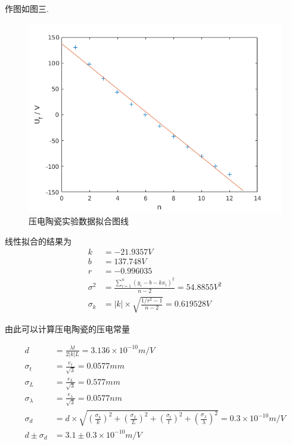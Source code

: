 \documentclass[a4paper,10pt,notitlepage]{article}
\begin{document}
	作图如图三. \\
	
\begin{figure}
\centering
	\includegraphics[scale=0.7]{f3.png}
	\caption{压电陶瓷实验数据拟合图线}
\end{figure}

	线性拟合的结果为 \\
	
\begin{align*}
	k &= -21.9357 V \\
	b &= 137.748 V \\
	r &= -0.996035 \\
	\sigma^2 &= \frac{\sum_{i = 1}^{n}(y_i - b - kx_i)^2}{n - 2} = 54.8855 V^2 \\
	\sigma_k &= |k| \times \sqrt{\frac{1/r^2 - 1}{n - 2}} = 0.619528V 
\end{align*}

	由此可以计算压电陶瓷的压电常量
	
\begin{align*}
	d &= \frac{\lambda t}{2|k|L} = 3.136 \times 10^{-10} m/V \\
	\sigma_t &= \frac{e_t}{\sqrt{3}} = 0.0577 mm \\
	\sigma_L &= \frac{e_L}{\sqrt{3}} = 0.577 mm \\
	\sigma_{\lambda} &= \frac{e_{\lambda}}{\sqrt{3}} = 0.0577 nm \\
	\sigma_d &= d \times \sqrt{(\frac{\sigma_k}{k})^2 + (\frac{\sigma_L}{L})^2 + (\frac{\sigma_t}{t})^2 + (\frac{\sigma_{\lambda}}{\lambda})^2} 
	= 0.3 \times 10^{-10} m/V \\
	d \pm \sigma_d &= 3.1 \pm 0.3 \times 10^{-10} m/V
\end{align*}
\end{document}
